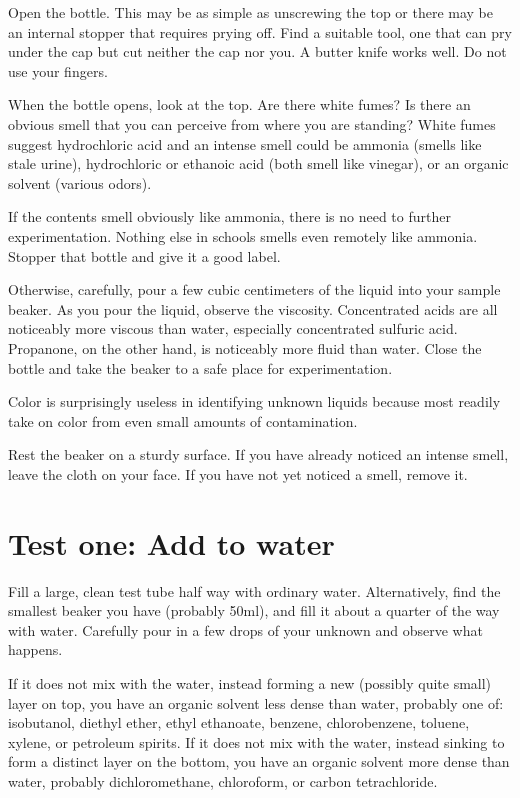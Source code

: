 Open the bottle. 
This may be as simple as unscrewing the top 
or there may be an internal stopper that requires prying off. 
Find a suitable tool, 
one that can pry under the cap but cut neither the cap nor you. 
A butter knife works well. 
Do not use your fingers.

When the bottle opens, 
look at the top. 
Are there white fumes? 
Is there an obvious smell that you can perceive 
from where you are standing? 
White fumes suggest hydrochloric acid 
and an intense smell could be ammonia (smells like stale urine), 
hydrochloric or ethanoic acid (both smell like vinegar), 
or an organic solvent (various odors).

If the contents smell obviously like ammonia, 
there is no need to further experimentation. 
Nothing else in schools smells even remotely like ammonia. 
Stopper that bottle and give it a good label.

Otherwise, 
carefully, 
pour a few cubic centimeters 
of the liquid into your sample beaker. 
As you pour the liquid, 
observe the viscosity. 
Concentrated acids are all noticeably more viscous than water, 
especially concentrated sulfuric acid. 
Propanone, 
on the other hand, 
is noticeably more fluid than water. 
Close the bottle and take the beaker 
to a safe place for experimentation.

Color is surprisingly useless in identifying unknown liquids 
because most readily take on color 
from even small amounts of contamination.

Rest the beaker on a sturdy surface. 
If you have already noticed an intense smell, 
leave the cloth on your face. 
If you have not yet noticed a smell, 
remove it.

\section{Test one: Add to water}

Fill a large, 
clean test tube half way with ordinary water. 
Alternatively, 
find the smallest beaker you have (probably 50ml), 
and fill it about a quarter of the way with water. 
Carefully pour in a few drops of your unknown 
and observe what happens. 


If it does not mix with the water, 
instead forming a new (possibly quite small) layer on top, 
you have an organic solvent less dense than water, 
probably one of: isobutanol, 
diethyl ether, 
ethyl ethanoate, 
benzene, 
chlorobenzene, 
toluene, 
xylene, 
or petroleum spirits. 
If it does not mix with the water, 
instead sinking to form a distinct layer on the bottom, 
you have an organic solvent more dense than water, 
probably dichloromethane, 
chloroform, 
or carbon tetrachloride.

